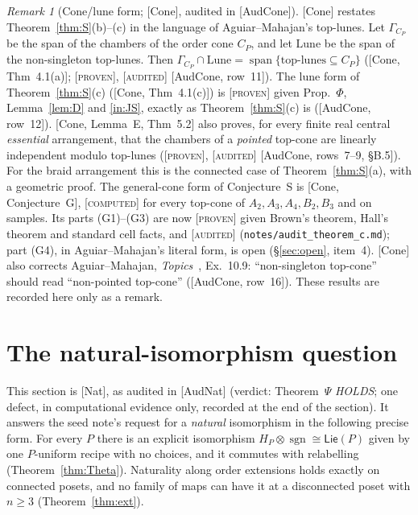 \documentclass[11pt]{article}
\theoremstyle{definition}
\theoremstyle{remark}
\newtheorem{remark}[theorem]{Remark}
\newcommand{\sgn}{\operatorname{sgn}}
\newcommand{\PLie}{\mathsf{Lie}}
\newcommand{\st}[1]{\textup{[\textsc{#1}]}}
\newcommand{\src}[1]{\nolinkurl{#1}}
\begin{document}
\begin{remark}[Cone/lune form; {[Cone]}, audited in {[AudCone]}]
[Cone] restates Theorem~\ref{thm:S}(b)--(c) in the language of
Aguiar--Mahajan's top-lunes. Let $\Gamma_{C_P}$ be the span of the chambers
of the order cone $C_P$, and let $\mathrm{Lune}$ be the span of the
non-singleton top-lunes. Then
$\Gamma_{C_P}\cap\mathrm{Lune}=\operatorname{span}\{\text{top-lunes}\subseteq C_P\}$
([Cone, Thm~4.1(a)]; \st{proven}, \st{audited} [AudCone, row~11]). The
lune form of Theorem~\ref{thm:S}(c) ([Cone, Thm~4.1(c)]) is \st{proven}
given Prop.~$\Phi$, Lemma~\ref{lem:D} and \ref{in:JS}, exactly as
Theorem~\ref{thm:S}(c) is ([AudCone, row~12]). [Cone, Lemma~E, Thm~5.2] also
proves, for every finite real central \emph{essential} arrangement, that the
chambers of a \emph{pointed} top-cone are linearly independent modulo
top-lunes (\st{proven}, \st{audited} [AudCone, rows~7--9, \S B.5]). For the braid arrangement this is the
connected case of Theorem~\ref{thm:S}(a), with a geometric proof. The
general-cone form of Conjecture~S is [Cone, Conjecture~G], \st{computed}
for every top-cone of $A_2,A_3,A_4,B_2,B_3$ and on samples. Its parts
(G1)--(G3) are now \st{proven} given Brown's theorem, Hall's theorem and
standard cell facts, and \st{audited} (\src{notes/audit_theorem_c.md}); part
(G4), in Aguiar--Mahajan's literal form, is open
(\S\ref{sec:open}, item~4). [Cone] also corrects Aguiar--Mahajan, \emph{Topics}~\cite{AguiarMahajan}, Ex.~10.9:
``non-singleton top-cone'' should read ``non-pointed top-cone''
([AudCone, row~16]). These results are recorded here only as a remark.
\end{remark}

\section{The natural-isomorphism question}\label{sec:natural}

This section is [Nat], as audited in [AudNat] (verdict: Theorem~$\Psi$
\emph{HOLDS}; one defect, in computational evidence only, recorded at the
end of the section). It answers the seed note's request for a
\emph{natural} isomorphism in the following precise form. For every $P$
there is an explicit isomorphism $H_P\otimes\sgn\cong\PLie(P)$ given by one
$P$-uniform recipe with no choices, and it commutes with relabelling
(Theorem~\ref{thm:Theta}). Naturality along order extensions holds exactly on
connected posets, and no family of maps can have it at a disconnected poset
with $n\ge3$ (Theorem~\ref{thm:ext}).
\end{document}
